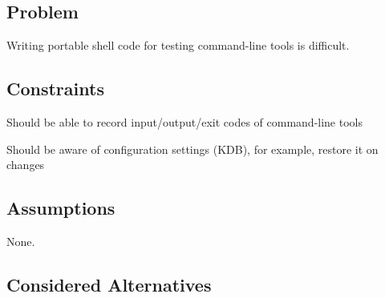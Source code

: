 \subsection*{Problem}

Writing portable shell code for testing command-\/line tools is difficult.

\subsection*{Constraints}


\begin{DoxyItemize}
\item Should be able to record input/output/exit codes of command-\/line tools
\item Should be aware of configuration settings (K\+DB), for example, restore it on changes
\end{DoxyItemize}

\subsection*{Assumptions}

None.

\subsection*{Considered Alternatives}


